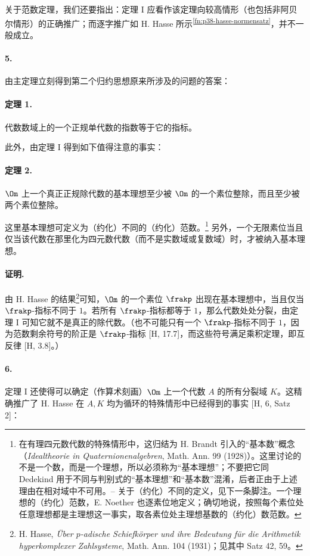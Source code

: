 关于范数定理，我们还要指出：定理 I 应看作该定理向较高情形（也包括非阿贝尔情形）的正确推广；而逐字推广如 H. Hasse 所示\textsuperscript{\ref{fn:p38-hasse-normensatz}}，并不一般成立。

\paragraph{5.}
由主定理立刻得到第二个归约思想原来所涉及的问题的答案：

\paragraph{定理 1.}
代数数域上的一个正规单代数的指数等于它的指标。

此外，由定理 I 得到如下值得注意的事实：

\paragraph{定理 2.}
\(\Om\) 上一个真正正规除代数的基本理想至少被 \(\Om\) 的一个素位整除，而且至少被两个素位整除。

这里基本理想可定义为（约化）不同的（约化）范数。\footnote{在有理四元数代数的特殊情形中，这归结为 H. Brandt 引入的“基本数”概念（\emph{Idealtheorie in Quaternionenalgebren}, Math. Ann. 99 (1928)）。这里讨论的不是一个数，而是一个理想，所以必须称为“基本理想”；不要把它同 Dedekind 用于不同与判别式的“基本理想”和“基本数”混淆，后者正由于上述理由在相对域中不可用。-- 关于（约化）不同的定义，见下一条脚注。一个理想的（约化）范数，E. Noether 也逐素位地定义；确切地说，按照每个素位处任意理想都是主理想这一事实，取各素位处主理想基数的（约化）数范数。} 另外，一个无限素位当且仅当该代数在那里化为四元数代数（而不是实数域或复数域）时，才被纳入基本理想。

\paragraph{证明.}
由 H. Hasse 的结果\footnote{\label{fn:p38-hasse-padisch}H. Hasse, \emph{Über \(p\)-adische Schiefkörper und ihre Bedeutung für die Arithmetik hyperkomplexer Zahlsysteme}, Math. Ann. 104 (1931)；见其中 Satz 42, 59。}可知，\(\Om\) 的一个素位 \(\frakp\) 出现在基本理想中，当且仅当 \(\frakp\)-指标不同于 \(1\)。若所有 \(\frakp\)-指标都等于 \(1\)，那么代数处处分裂，由定理 I 可知它就不是真正的除代数。（也不可能只有一个 \(\frakp\)-指标不同于 \(1\)，因为范数剩余符号的阶正是 \(\frakp\)-指标 [H, 17.7]，而这些符号满足乘积定理，即互反律 [H, 3.8]。）

\paragraph{6.}
定理 I 还使得可以确定（作算术刻画）\(\Om\) 上一个代数 \(A\) 的所有分裂域 \(K\)。这精确推广了 H. Hasse 在 \(A,K\) 均为循环的特殊情形中已经得到的事实 [H, 6, Satz 2]：

